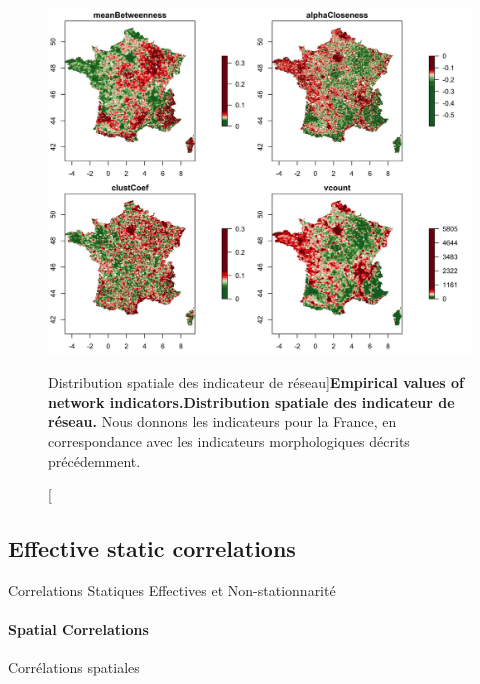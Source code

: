 \begin{figure}
\includegraphics[width=\linewidth]{Figures/Final/4-1-2-fig-staticcorrs-network}
\caption[Empirical values of network indicators][Distribution spatiale des indicateur de réseau]{\textbf{Empirical values of network indicators.}\label{fig:staticcorrs:network}}{\textbf{Distribution spatiale des indicateur de réseau.} Nous donnons les indicateurs pour la France, en correspondance avec les indicateurs morphologiques décrits précédemment.\label{fig:staticcorrs:network}}
\end{figure}





\subsection{Effective static correlations}{Correlations Statiques Effectives et Non-stationnarité}





\paragraph{Spatial Correlations}{Corrélations spatiales}


